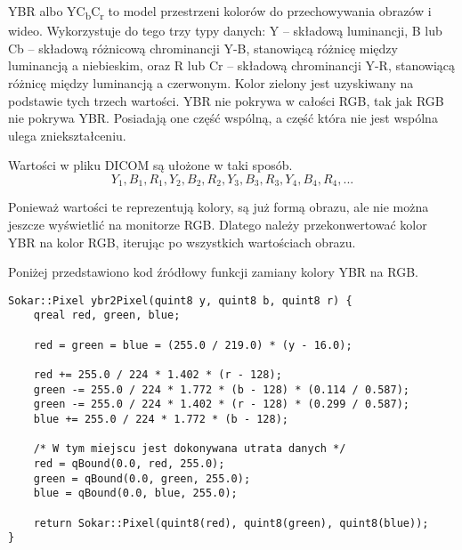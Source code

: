 \label{sec:algorithm-pixmap-ybr}

\par
YBR albo YC\textsubscript{b}C\textsubscript{r} to model przestrzeni kolorów do przechowywania obrazów i wideo.
Wykorzystuje do tego trzy typy danych: Y – składową luminancji, B lub Cb – składową różnicową chrominancji Y-B, stanowiącą różnicę między luminancją a niebieskim, oraz R lub Cr – składową chrominancji Y-R, stanowiącą różnicę między luminancją a czerwonym.
Kolor zielony jest uzyskiwany na podstawie tych trzech wartości.
YBR nie pokrywa w całości RGB, tak jak RGB nie pokrywa YBR.
Posiadają one część wspólną, a część która nie jest wspólna ulega zniekształceniu.

\par
Wartości w pliku DICOM są ułożone w taki sposób.
\[Y_1, B_1, R_1, Y_2, B_2, R_2, Y_3, B_3, R_3, Y_4, B_4, R_4,  ...\]

\par
Ponieważ wartości te reprezentują kolory, są już formą obrazu, ale nie można jeszcze wyświetlić na monitorze RGB.
Dlatego należy przekonwertować kolor YBR na kolor RGB, iterując po wszystkich wartościach obrazu.

\par
Poniżej przedstawiono kod źródłowy funkcji zamiany kolory YBR na RGB.

\begin{lstlisting}
Sokar::Pixel ybr2Pixel(quint8 y, quint8 b, quint8 r) {
    qreal red, green, blue;

    red = green = blue = (255.0 / 219.0) * (y - 16.0);

    red += 255.0 / 224 * 1.402 * (r - 128);
    green -= 255.0 / 224 * 1.772 * (b - 128) * (0.114 / 0.587);
    green -= 255.0 / 224 * 1.402 * (r - 128) * (0.299 / 0.587);
    blue += 255.0 / 224 * 1.772 * (b - 128);

    /* W tym miejscu jest dokonywana utrata danych */
    red = qBound(0.0, red, 255.0);
    green = qBound(0.0, green, 255.0);
    blue = qBound(0.0, blue, 255.0);

    return Sokar::Pixel(quint8(red), quint8(green), quint8(blue));
}
\end{lstlisting}